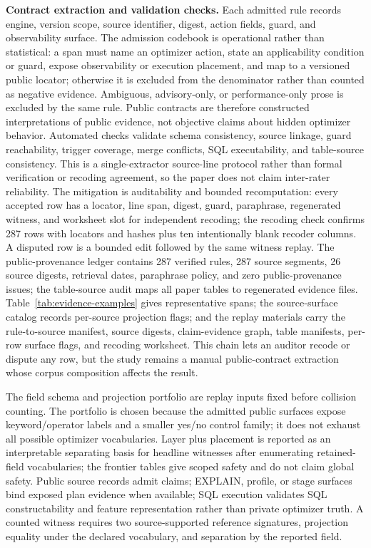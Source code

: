 \textbf{Contract extraction and validation checks.}  Each admitted rule records engine, version scope, source identifier, digest, action fields, guard, and observability surface.  The admission codebook is operational rather than statistical: a span must name an optimizer action, state an applicability condition or guard, expose observability or execution placement, and map to a versioned public locator; otherwise it is excluded from the denominator rather than counted as negative evidence.  Ambiguous, advisory-only, or performance-only prose is excluded by the same rule.  Public contracts are therefore constructed interpretations of public evidence, not objective claims about hidden optimizer behavior.  Automated checks validate schema consistency, source linkage, guard reachability, trigger coverage, merge conflicts, SQL executability, and table-source consistency.  This is a single-extractor source-line protocol rather than formal verification or recoding agreement, so the paper does not claim inter-rater reliability.  The mitigation is auditability and bounded recomputation: every accepted row has a locator, line span, digest, guard, paraphrase, regenerated witness, and worksheet slot for independent recoding; the recoding check confirms 287 rows with locators and hashes plus ten intentionally blank recoder columns.  A disputed row is a bounded edit followed by the same witness replay.  The public-provenance ledger contains 287 verified rules, 287 source segments, 26 source digests, retrieval dates, paraphrase policy, and zero public-provenance issues; the table-source audit maps all paper tables to regenerated evidence files.  Table~\ref{tab:evidence-examples} gives representative spans; the source-surface catalog records per-source projection flags; and the replay materials carry the rule-to-source manifest, source digests, claim-evidence graph, table manifests, per-row surface flags, and recoding worksheet.  This chain lets an auditor recode or dispute any row, but the study remains a manual public-contract extraction whose corpus composition affects the result.

The field schema and projection portfolio are replay inputs fixed before collision counting.  The portfolio is chosen because the admitted public surfaces expose keyword/operator labels and a smaller yes/no control family; it does not exhaust all possible optimizer vocabularies.  Layer plus placement is reported as an interpretable separating basis for headline witnesses after enumerating retained-field vocabularies; the frontier tables give scoped safety and do not claim global safety.  Public source records admit claims; EXPLAIN, profile, or stage surfaces bind exposed plan evidence when available; SQL execution validates SQL constructability and feature representation rather than private optimizer truth.  A counted witness requires two source-supported reference signatures, projection equality under the declared vocabulary, and separation by the reported field.

